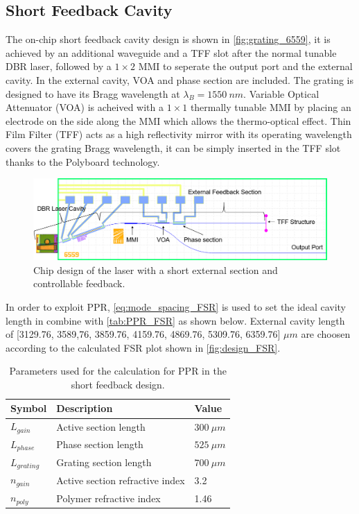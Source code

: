 \subsection{Short Feedback Cavity} \label{subsec:short_feedback_cavity}
The on-chip short feedback cavity design is shown in \autoref{fig:grating_6559}, it is achieved by an additional waveguide and a TFF slot after the normal tunable DBR laser, followed by a $1\times 2$ MMI to seperate the output port and the external cavity. In the external cavity, VOA and phase section are included. The grating is designed to have its Bragg wavelength at $\lambda_B=1550 \ nm$.  Variable Optical Attenuator (VOA) is acheived with a $1\times 1$  thermally tunable MMI by placing an electrode on the side along the MMI which allows the thermo-optical effect. Thin Film Filter (TFF) acts as a high reflectivity mirror with its operating wavelength covers the grating Bragg wavelength, it can be simply inserted in the TFF slot thanks to the Polyboard technology. 

\begin{figure}[H]
    \centering
    \includegraphics[width=\linewidth]{figures/6559_short_comment.png}
    \caption{Chip design of the laser with a short external section and controllable feedback.}
    \label{fig:grating_6559_design}
\end{figure}

In order to exploit PPR, \autoref{eq:mode_spacing_FSR} is used to set the ideal cavity length in combine with \autoref{tab:PPR_FSR} as shown below. External cavity length of [3129.76, 3589,76, 3859.76, 4159.76, 4869.76, 5309.76, 6359.76] $\mu m$ are choosen according to the calculated FSR plot shown in \autoref{fig:design_FSR}.

\begin{table}[ht]
    \centering
    \caption{Parameters used for the calculation for PPR in the short feedback design.}
    \label{tab:PPR_FSR}
    \begin{tabular}{@{}lll@{}}
    \toprule
    Symbol          & Description                      & Value             \\ \midrule
    $L_{gain}$      & Active section length            & $300 \ \mu m$     \\
    $L_{phase}$     & Phase section length             & $525 \ \mu m$     \\
    $L_{grating}$   & Grating section length           & $700 \ \mu m$     \\
    $n_{gain}$      & Active section refractive index  & 3.2               \\
    $n_{poly}$      & Polymer refractive index         & 1.46              \\
    \bottomrule
    \end{tabular}
\end{table}

